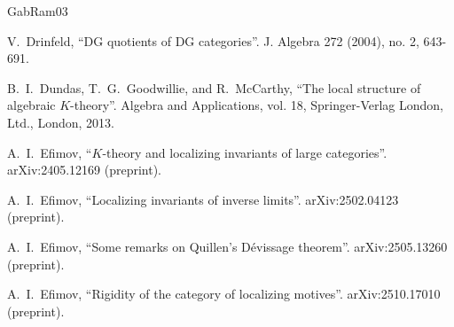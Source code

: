 \documentclass[11pt,leqno]{amsart}
\numberwithin{equation}{section}
\begin{document}
\begin{thebibliography}{GabRam03}


V.~Drinfeld, ``DG quotients of DG categories''. J. Algebra 272 (2004), no. 2, 643-691.

 B.~I.~Dundas, T.~G.~Goodwillie, and R.~McCarthy, ``The local structure of algebraic $K$-theory''. Algebra
and Applications, vol. 18, Springer-Verlag London, Ltd., London, 2013.

A.~I.~Efimov, ``$K$-theory and localizing invariants of large categories''.  arXiv:2405.12169 (preprint).


A.~I.~Efimov, ``Localizing invariants of inverse limits''. arXiv:2502.04123 (preprint).

A.~I.~Efimov, ``Some remarks on Quillen's Dévissage theorem''. arXiv:2505.13260 (preprint).

A.~I.~Efimov, ``Rigidity of the category of localizing motives''. arXiv:2510.17010 (preprint).






\end{thebibliography}
\end{document}

